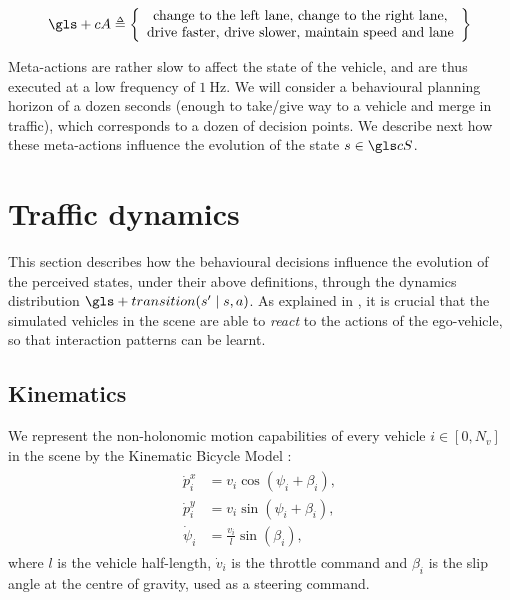 \begin{equation}
\label{eq:action-space}
\gls+{cA} \eqdef \left\{ \begin{array}{c}
\text{change to the left lane},\, \text{change to the right lane}, \\
\text{drive faster},\, \text{drive slower},\, \text{maintain speed and lane}
\end{array}\right\}
\end{equation}

Meta-actions are rather slow to affect the state of the vehicle, and are thus executed at a low frequency of $\SI{1}{\hertz}$. We will consider a behavioural planning horizon of a dozen seconds (enough to \eg take/give way to a vehicle and merge in traffic), which corresponds to a dozen of decision points. We describe next how these meta-actions influence the evolution of the state $s\in\cS$.

\section{Traffic dynamics}

This section describes how the behavioural decisions influence the evolution of the perceived states, under their above definitions, through the dynamics distribution $\gls+{transition}\parentheses{s' \mid s,a}$. As explained in , it is crucial that the simulated vehicles in the scene are able to \emph{react} to the actions of the ego-vehicle, so that interaction patterns can be learnt.

\subsection{Kinematics}

We represent the non-holonomic motion capabilities of every vehicle $i\in[0, N_v]$ in the scene by the Kinematic Bicycle Model \citep[see \eg][]{Polack2017}:
\begin{align}
\begin{split}
\dot{p}^x_i &= v_i\cos(\psi_i + \beta_i), \\
\dot{p}^y_i &= v_i\sin(\psi_i + \beta_i),\\
\dot{\psi}_i &= \frac{v_i}{l}\sin(\beta_i),
\end{split}
\end{align}
where $l$ is the vehicle half-length, $\dot{v}_i$ is the throttle command and $\beta_i$ is the slip angle at the centre of gravity, used as a steering command.

